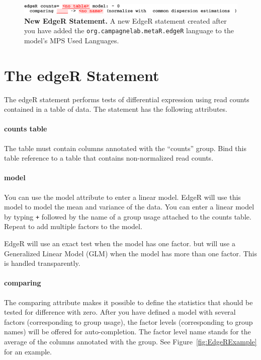 \begin{figure}[h!tbp]
  \centering
  \includegraphics[width=\figWidthWide]{figures/NewEdgeRStatement.pdf}
\caption[New EdgeR Statement.]{\textbf{New EdgeR Statement.} A new EdgeR statement created after you have added the \texttt{org.campagnelab.metaR.edgeR} language to the model's MPS Used Languages.}
\label{fig:NewEdgeRStatement}
\end{figure}

\section{The edgeR Statement}
The edgeR statement performs tests of differential expression using read counts contained in a table of data. The statement has the following attributes.

\paragraph{counts table}
The table must contain columns annotated with the ``counts'' group. Bind this table reference to a table that contains non-normalized read counts.

\paragraph{model}
You can use the model attribute to enter a linear model. EdgeR will use this model to model the mean and variance of the data. You can enter a linear model by typing \texttt{+} followed by the name of a group usage attached to the counts table. Repeat to add multiple factors to the model. 
\begin{remark}
EdgeR will use an exact test when the model has one factor. but will use a Generalized Linear Model (GLM) when the model has more than one factor. This is handled transparently.
\end{remark}

\paragraph{comparing}
The comparing attribute makes it possible to define the statistics that should be tested for difference with zero. After you have defined a model with several factors (corresponding to group usage), the factor levels (corresponding to group names) will be offered for auto-completion. The factor level name stands for the average of the columns annotated with the group. See Figure~\ref{fig:EdgeRExample} for an example. 

